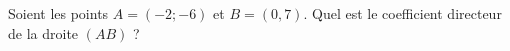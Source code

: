 
\begin{exercice}\label{exosmath-0130}

Soient les points \( A=(-2;-6)\) et \( B=(0,7)\). Quel est le coefficient directeur de la droite \( (AB)\) ?

\end{exercice}
